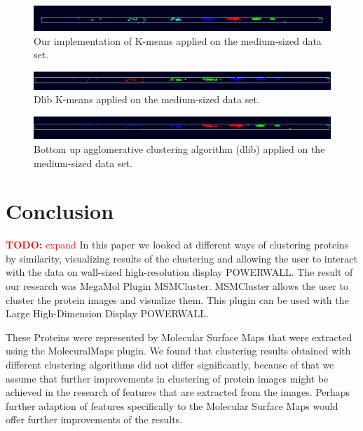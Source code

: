 \documentclass[journal]{vgtc}       %
\newcommand{\todo}[1]{\textcolor{red}{\textbf{TODO:} #1}}
\begin{document}
\begin{figure}[h!]
	\begin{center}
		\includegraphics[width=.75\linewidth]{k-Means-mediumDataSet.png}
	\end{center}
	\caption{\label{fig:kmeans} Our implementation of K-means applied on the medium-sized data set.}
\end{figure} 
\begin{figure}[h!]
	\begin{center}
		\includegraphics[width=.75\linewidth]{k-Means-dlib-mediumDataSet.png}
	\end{center}
	\caption{\label{fig:kmeans-dlib} Dlib K-means applied on the medium-sized data set.}
\end{figure}
\begin{figure}[h!]
	\begin{center}
		\includegraphics[width=.75\linewidth]{bottomUpAgglomerative-mediumDataSet.png}
	\end{center}
	\caption{\label{fig:bottomUpAgglomerative} Bottom up agglomerative clustering algorithm (dlib) applied on the medium-sized data set.}
\end{figure}


\section{Conclusion}
\todo{expand}
In this paper we looked at different ways of clustering proteins by similarity, visualizing results of the clustering and allowing the user to interact with the data on wall-sized high-resolution display POWERWALL. The result of our research was MegaMol Plugin MSMCluster. MSMCluster allows the user to cluster the protein images and visualize them. This plugin can be used with the Large High-Dimension Display POWERWALL. 

These Proteins were represented by Molecular Surface Maps that were extracted using the MolecuralMaps plugin.
We found that clustering results obtained with different clustering algorithms did not differ significantly, because of that we assume that further improvements in clustering of protein images might be achieved in the research of features that are extracted from the images. Perhaps further adaption of features specifically to the Molecular Surface Maps would offer further improvements of the results. 
\end{document}
